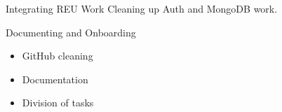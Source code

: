 
\begin{frame}{Integrating REU Work}
    Cleaning up Auth and MongoDB work.
\end{frame}

\begin{frame}{Documenting and Onboarding}
    \begin{itemize}
        \item GitHub cleaning
        \item Documentation
        \item Division of tasks
    \end{itemize}    
\end{frame}
